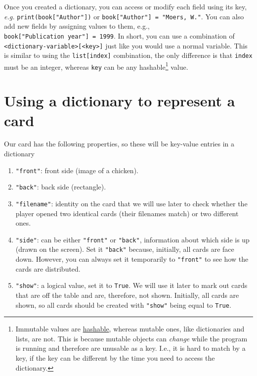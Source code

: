 \documentclass[
]{book}
\providecommand{\tightlist}{%
  \setlength{\itemsep}{0pt}\setlength{\parskip}{0pt}}
\begin{document}
Once you created a dictionary, you can access or modify each field using its key, \emph{e.g.} \texttt{print(book{[}"Author"{]})} or \texttt{book{[}"Author"{]}\ =\ "Moers,\ W."}. You can also add new fields by assigning values to them, e.g., \texttt{book{[}"Publication\ year"{]}\ =\ 1999}. In short, you can use a combination of \texttt{\textless{}dictionary-variable\textgreater{}{[}\textless{}key\textgreater{}{]}} just like you would use a normal variable. This is similar to using the \texttt{list{[}index{]}} combination, the only difference is that \texttt{index} must be an integer, whereas \texttt{key} can be any hashable\footnote{Immutable values are \href{https://docs.python.org/3/glossary.html\#term-hashable}{hashable}, whereas mutable ones, like dictionaries and lists, are not. This is because mutable objects can \emph{change} while the program is running and therefore are unusable as a key. I.e., it is hard to match by a key, if the key can be different by the time you need to access the dictionary.} value.

\hypertarget{using-a-dictionary-to-represent-a-card}{%
\section{Using a dictionary to represent a card}\label{using-a-dictionary-to-represent-a-card}}

Our card has the following properties, so these will be key-value entries in a dictionary

\begin{enumerate}
\def\labelenumi{\arabic{enumi}.}
\tightlist
\item
  \texttt{"front"}: front side (image of a chicken).
\item
  \texttt{"back"}: back side (rectangle).
\item
  \texttt{"filename"}: identity on the card that we will use later to check whether the player opened two identical cards (their filenames match) or two different ones.
\item
  \texttt{"side"}: can be either \texttt{"front"} or \texttt{"back"}, information about which side is up (drawn on the screen). Set it \texttt{"back"} because, initially, all cards are face down. However, you can always set it temporarily to \texttt{"front"} to see how the cards are distributed.
\item
  \texttt{"show"}: a logical value, set it to \texttt{True}. We will use it later to mark out cards that are off the table and are, therefore, not shown. Initially, all cards are shown, so all cards should be created with \texttt{"show"} being equal to \texttt{True}.
\end{enumerate}
\end{document}
